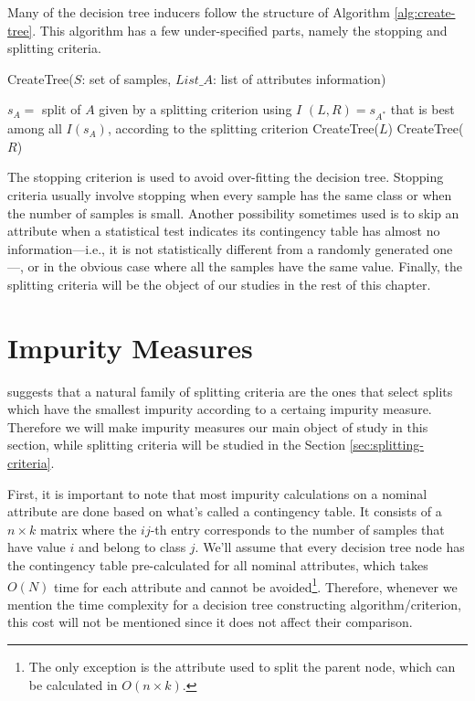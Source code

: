 Many of the decision tree inducers follow the structure of Algorithm \ref{alg:create-tree}. This algorithm has a few under-specified parts, namely the stopping and splitting criteria.

\begin{algorithm}[tb]
   \caption{CreateTree($S$: set of samples, $List\_A$: list of attributes information)}
   \label{alg:create-tree}
\begin{algorithmic}
\STATE $s_A = $ split of $A$ given by a splitting criterion using $I$
\ENDFOR
\STATE $(L, R) = s_{A^*}$  that is best among all $ I(s_A) $, according to the splitting criterion
\STATE CreateTree($L$)
\STATE CreateTree($R$)
\ENDIF
\end{algorithmic}
\end{algorithm}

The stopping criterion is used to avoid over-fitting the decision tree. Stopping criteria usually involve stopping when every sample has the same class or when the number of samples is small. Another possibility sometimes used is to skip an attribute when a statistical test indicates its contingency table has almost no information---i.e., it is not statistically different from a randomly generated one---, or in the obvious case where all the samples have the same value. Finally, the splitting criteria will be the object of our studies in the rest of this chapter.


\section{Impurity Measures}

\cite{Breiman84} suggests that a natural family of splitting criteria are the ones that select splits which have the smallest impurity according to a certaing impurity measure. Therefore we will make impurity measures our main object of study in this section, while splitting criteria will be studied in the Section \ref{sec:splitting-criteria}.

First, it is important to note that most impurity calculations on a nominal attribute are done based on what's called a contingency table. It consists of a $n\times k$ matrix where the $ij$-th entry corresponds to the number of samples that have value $i$ and belong to class $j$. We'll assume that every decision tree node has the contingency table pre-calculated for all nominal attributes, which takes $O(N)$ time for each attribute and cannot be avoided\footnote{The only exception is the attribute used to split the parent node, which can be calculated in $O(n\times k)$.}. Therefore, whenever we mention the time complexity for a decision tree constructing algorithm/criterion, this cost will not be mentioned since it does not affect their comparison.

